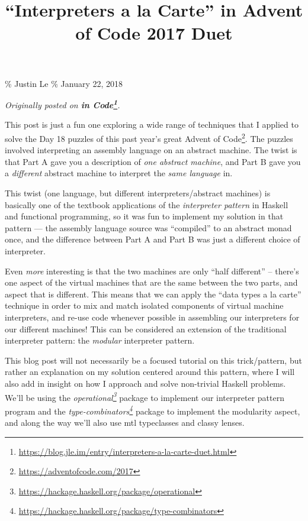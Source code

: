 \documentclass[]{article}
\title{``Interpreters a la Carte'' in Advent of Code 2017 Duet}
\renewcommand{\href}[2]{#2\footnote{\url{#1}}}
\begin{document}
\maketitle

\% Justin Le \% January 22, 2018

\emph{Originally posted on
\textbf{\href{https://blog.jle.im/entry/interpreters-a-la-carte-duet.html}{in
Code}}.}

This post is just a fun one exploring a wide range of techniques that I applied
to solve the Day 18 puzzles of this past year's great
\href{https://adventofcode.com/2017}{Advent of Code}. The puzzles involved
interpreting an assembly language on an abstract machine. The twist is that Part
A gave you a description of \emph{one abstract machine}, and Part B gave you a
\emph{different} abstract machine to interpret the \emph{same language} in.

This twist (one language, but different interpreters/abstract machines) is
basically one of the textbook applications of the \emph{interpreter pattern} in
Haskell and functional programming, so it was fun to implement my solution in
that pattern --- the assembly language source was ``compiled'' to an abstract
monad once, and the difference between Part A and Part B was just a different
choice of interpreter.

Even \emph{more} interesting is that the two machines are only ``half
different'' -- there's one aspect of the virtual machines that are the same
between the two parts, and aspect that is different. This means that we can
apply the ``data types a la carte'' technique in order to mix and match isolated
components of virtual machine interpreters, and re-use code whenever possible in
assembling our interpreters for our different machines! This can be considered
an extension of the traditional interpreter pattern: the \emph{modular}
interpreter pattern.

This blog post will not necessarily be a focused tutorial on this trick/pattern,
but rather an explanation on my solution centered around this pattern, where I
will also add in insight on how I approach and solve non-trivial Haskell
problems. We'll be using the
\emph{\href{https://hackage.haskell.org/package/operational}{operational}}
package to implement our interpreter pattern program and the
\emph{\href{https://hackage.haskell.org/package/type-combinators}{type-combinators}}
package to implement the modularity aspect, and along the way we'll also use mtl
typeclasses and classy lenses.
\end{document}
